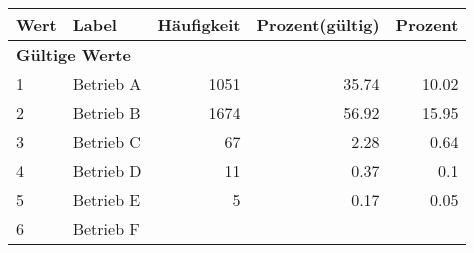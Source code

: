      \begin{longtable}{lXrrr}
     \toprule
     \textbf{Wert} & \textbf{Label} & \textbf{Häufigkeit} & \textbf{Prozent(gültig)} & \textbf{Prozent} \\
     \endhead
     \midrule
     \multicolumn{5}{l}{\textbf{Gültige Werte}}\\

     1 &
     \multicolumn{1}{X}{ Betrieb A   } &


       \num{1051} &
       \num[round-mode=places,round-precision=2]{35,74} &
         \num[round-mode=places,round-precision=2]{10,02} \\

     2 &
     \multicolumn{1}{X}{ Betrieb B   } &


       \num{1674} &
       \num[round-mode=places,round-precision=2]{56,92} &
         \num[round-mode=places,round-precision=2]{15,95} \\

     3 &
     \multicolumn{1}{X}{ Betrieb C   } &


       \num{67} &
       \num[round-mode=places,round-precision=2]{2,28} &
         \num[round-mode=places,round-precision=2]{0,64} \\

     4 &
     \multicolumn{1}{X}{ Betrieb D   } &


       \num{11} &
       \num[round-mode=places,round-precision=2]{0,37} &
         \num[round-mode=places,round-precision=2]{0,1} \\

     5 &
     \multicolumn{1}{X}{ Betrieb E   } &


       \num{5} &
       \num[round-mode=places,round-precision=2]{0,17} &
         \num[round-mode=places,round-precision=2]{0,05} \\

     6 &
     \multicolumn{1}{X}{ Betrieb F   } &



\end{longtable}
